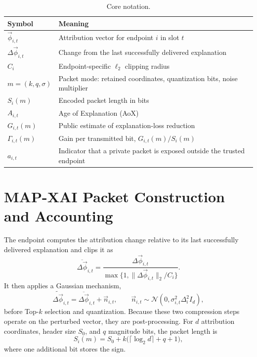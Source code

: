 \documentclass[10pt,conference]{IEEEtran}
\begin{document}
\begin{table}[b]
\caption{Core notation.}
\label{tab:notation}
\centering\small
\begin{tabular}{p{}p{}}
\toprule
Symbol & Meaning\\ \midrule
$\vec\phi_{i,t}$ & Attribution vector for endpoint $i$ in slot $t$\\
$\Delta\vec\phi_{i,t}$ & Change from the last successfully delivered explanation\\
$C_i$ & Endpoint-specific $\ell_2$ clipping radius\\
$m=(k,q,\sigma)$ & Packet mode: retained coordinates, quantization bits, noise multiplier\\
$S_i(m)$ & Encoded packet length in bits\\
$A_{i,t}$ & Age of Explanation (AoX)\\
$G_{i,t}(m)$ & Public estimate of explanation-loss reduction\\
$\Gamma_{i,t}(m)$ & Gain per transmitted bit, $G_{i,t}(m)/S_i(m)$\\
$a_{i,t}$ & Indicator that a private packet is exposed outside the trusted endpoint\\
\bottomrule
\end{tabular}
\end{table}

\section{MAP-XAI Packet Construction and Accounting}

The endpoint computes the attribution change relative to its last successfully
delivered explanation and clips it as
\begin{equation}
\overline{\Delta\vec\phi}_{i,t}=
\frac{\Delta\vec\phi_{i,t}}
{\max\{1,\|\Delta\vec\phi_{i,t}\|_2/C_i\}}.
\end{equation}
It then applies a Gaussian mechanism,
\begin{equation}
\widetilde{\Delta\vec\phi}_{i,t}=
\overline{\Delta\vec\phi}_{i,t}+\vec n_{i,t},\qquad
\vec n_{i,t}\sim\mathcal N(0,\sigma_{i,t}^2\Delta_i^2 I_d),
\end{equation}
before Top-$k$ selection and quantization. Because these two compression steps
operate on the perturbed vector, they are post-processing. For $d$ attribution
coordinates, header size $S_0$, and $q$ magnitude bits, the packet length is
\begin{equation}
S_i(m)=S_0+k\bigl(\lceil\log_2d\rceil+q+1\bigr),
\end{equation}
where one additional bit stores the sign.
\end{document}
